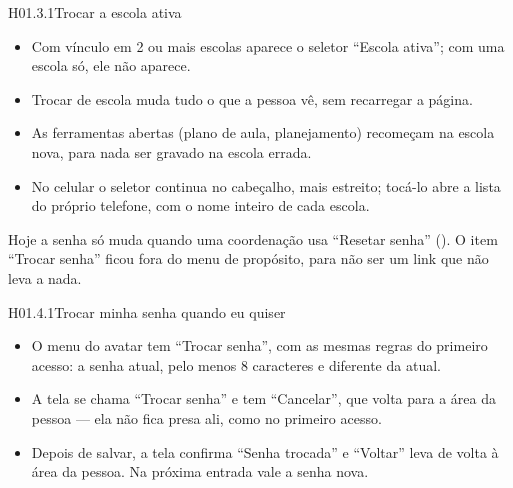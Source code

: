 
\begin{historia}{H01.3.1}{Trocar a escola ativa}{\pronto}
\aceite
\begin{itemize}
  \item Com vínculo em 2 ou mais escolas aparece o seletor \enquote{Escola
    ativa}; com uma escola só, ele não aparece.
  \item Trocar de escola muda tudo o que a pessoa vê, sem recarregar a página.
  \item As ferramentas abertas (plano de aula, planejamento) recomeçam na
    escola nova, para nada ser gravado na escola errada.
  \item No celular o seletor continua no cabeçalho, mais estreito; tocá-lo
    abre a lista do próprio telefone, com o nome inteiro de cada escola.
\end{itemize}
\end{historia}


Hoje a senha só muda quando uma coordenação usa \enquote{Resetar senha}
(). O item \enquote{Trocar senha} ficou fora do menu de propósito,
para não ser um link que não leva a nada.

\begin{historia}{H01.4.1}{Trocar minha senha quando eu quiser}{\pronto}
\aceite
\begin{itemize}
  \item O menu do avatar tem \enquote{Trocar senha}, com as mesmas regras do
    primeiro acesso: a senha atual, pelo menos 8 caracteres e diferente da
    atual.
  \item A tela se chama \enquote{Trocar senha} e tem \enquote{Cancelar}, que
    volta para a área da pessoa --- ela não fica presa ali, como no primeiro
    acesso.
  \item Depois de salvar, a tela confirma \enquote{Senha trocada} e
    \enquote{Voltar} leva de volta à área da pessoa. Na próxima entrada vale a
    senha nova.
\end{itemize}
\end{historia}

